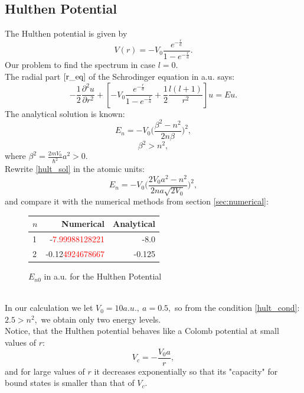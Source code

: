 \documentclass[a4paper, 12pt]{article}
\begin{document}
\subsection{Hulthen Potential}
The Hulthen potential is given by
\begin{equation}
V(r) = - V_0 \frac{e^{-\frac{r}{a}}}{1 - e^{-\frac{r}{a}}}.
\end{equation}
Our problem to find the spectrum in case $l=0.$\\
The radial part $\eqref{r_eq}$ of the Schrodinger equation in a.u.  says:
$$-\frac{1}{2}\frac{\partial^2 u}{\partial r^2}+[- V_0 \frac{e^{-\frac{r}{a}}}{1 - e^{-\frac{r}{a}}} +\frac{1}{2}\frac{l(l+1)}{r^2}]u = Eu.$$
The analytical solution is known:
\begin{equation}\label{hult_sol}
E_n = -V_0\bigg(\frac{\beta^2 - n^2}{2n\beta}\bigg)^2,
\end{equation}
\begin{equation}\label{hult_cond}
\beta^2 > n^2, 
\end{equation}
where $\beta^2 = \displaystyle{\frac{2m V_0}{\hbar^2}a^2} > 0.$\\
Rewrite \eqref{hult_sol} in the atomic units:
$$E_n = -V_0\bigg(\frac{2 V_0 a^2 - n^2}{2n a \sqrt{2V_0}}\bigg)^2,$$
and compare it with the numerical methods from section  \ref{sec:numerical}:
\begin{figure}
	\centering
	\begin{tabular}{lrr}
		\toprule
		\centering
		$n$ &         Numerical &         Analytical \\
		\midrule
		1 & -\textcolor{red}{7.99988128221} & -8.0 \\
		2 & -0.12\textcolor{red}{4924678667} & -0.125 \\
		\bottomrule
	\end{tabular}
	\caption{$E_{n0}$ in a.u. for the Hulthen Potential}
\end{figure}\\
In our calculation we let $V_0 = 10 a.u.,~a = 0.5,$ so from the condition \ref{hult_cond}: $2.5 > n^2,$ we obtain only two energy levels.\\
Notice, that the Hulthen potential behaves like  a Colomb potential at small values of $r:$
$$V_c = -\frac{V_0 a}{r},$$
and for large values of $r$ it decreases exponentially so that its "capacity" for bound states is smaller than that of $V_c.$
\end{document}
